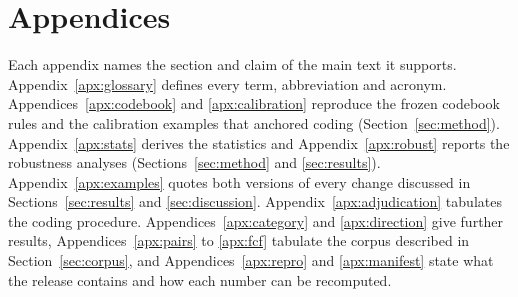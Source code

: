\documentclass{article}
\begin{document}




\appendix
\section*{Appendices}
Each appendix names the section and claim of the main text it supports. Appendix~\ref{apx:glossary} defines every term, abbreviation and acronym. Appendices~\ref{apx:codebook} and \ref{apx:calibration} reproduce the frozen codebook rules and the calibration examples that anchored coding (Section~\ref{sec:method}). Appendix~\ref{apx:stats} derives the statistics and Appendix~\ref{apx:robust} reports the robustness analyses (Sections~\ref{sec:method} and \ref{sec:results}). Appendix~\ref{apx:examples} quotes both versions of every change discussed in Sections~\ref{sec:results} and \ref{sec:discussion}. Appendix~\ref{apx:adjudication} tabulates the coding procedure. Appendices~\ref{apx:category} and \ref{apx:direction} give further results, Appendices~\ref{apx:pairs} to \ref{apx:fcf} tabulate the corpus described in Section~\ref{sec:corpus}, and Appendices~\ref{apx:repro} and \ref{apx:manifest} state what the release contains and how each number can be recomputed.
\end{document}
